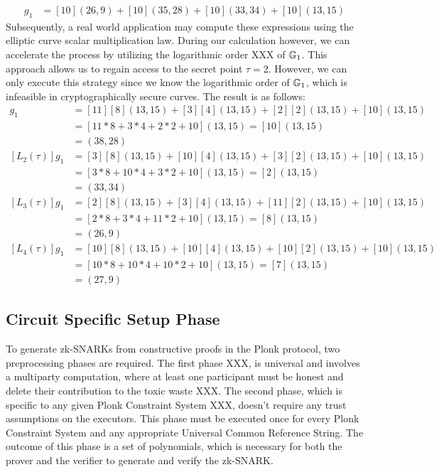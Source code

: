 \begin{example}
\begin{align*}
[L_4(\tau)]g_1 & = [10](26,9)+[10](35,28)+[10](33,34) + [10](13,15)
\end{align*}
Subsequently, a real world application may compute these expressions using the elliptic curve scalar multiplication law. During our calculation however, we can accelerate the process by utilizing the logarithmic order XXX of $\mathbb{G}_1$. This approach allows us to regain access to the secret point $\tau=2$. However, we can only execute this strategy since we know the logarithmic order of $\mathbb{G}_1$, which is infeasible in cryptographically secure curves. The result is as follows:
\begin{align*}
[L_1(\tau)]g_1 & = [11][8](13,15) +[3][4](13,15) +[2][2](13,15) + [10](13,15) \\
               & = [11*8+3*4+2*2+10](13,15) = [10](13,15) \\
               & = (38,28)\\
[L_2(\tau)]g_1 & = [3][8](13,15) + [10][4](13,15) + [3][2](13,15) + [10](13,15) \\
               & = [3*8+10*4+3*2+10](13,15) = [2](13,15) \\
               & = (33,34)\\
[L_3(\tau)]g_1 & = [2][8](13,15) + [3][4](13,15) +[11][2](13,15) +[10](13,15)\\
               & = [2*8+3*4+11*2+10](13,15) = [8](13,15)\\
               & = (26,9)\\
[L_4(\tau)]g_1 & = [10][8](13,15) + [10][4](13,15) + [10][2](13,15) + [10](13,15)\\
               & = [10*8 + 10*4 + 10*2 + 10](13,15) = [7] (13,15)\\
               & = (27,9)
\end{align*}
\end{example}


\subsection{Circuit Specific Setup Phase}
To generate zk-SNARKs from constructive proofs in the Plonk protocol, two preprocessing phases are required. The first phase XXX, is universal and involves  a multiparty computation, where at least one participant must be honest and delete their contribution to the toxic waste XXX. The second phase, which is specific to any given Plonk Constraint System XXX, doesn't require any trust assumptions on the executors. This phase must be executed once for every Plonk Constraint System and any appropriate Universal Common Reference String. The outcome of this phase is a set of polynomials, which is necessary for both the prover and the verifier to generate and verify the zk-SNARK.

